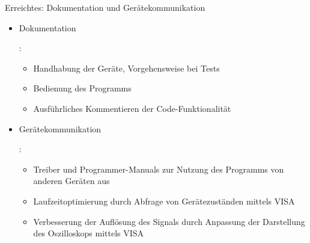 \begin{frame}{Erreichtes: Dokumentation und Gerätekommunikation  }

\begin{itemize}
	
	\item Dokumentation \uncover<2-> {: 
		\begin{itemize}
			\item Handhabung der Geräte, Vorgehensweise bei Tests
			\item Bedienung des Programms 
			\item Ausführliches Kommentieren der Code-Funktionalität
		\end{itemize}
		}
	\item Gerätekommunikation \uncover<3-> {:
		\begin{itemize}
			\item Treiber und Programmer-Manuals zur Nutzung des Programms von anderen Geräten aus 
			\item Laufzeitoptimierung durch Abfrage von Gerätezuständen mittels VISA
			\item Verbesserung der Auflösung des Signals durch Anpassung der Darstellung des Oszilloskops mittels VISA
		\end{itemize}
		}
	
	
\end{itemize}

\end{frame}



